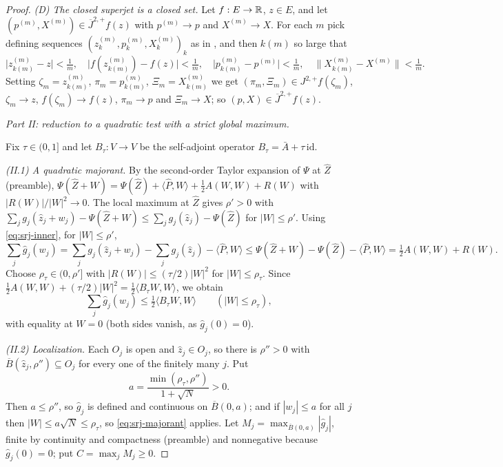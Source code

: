 \begin{proof}
\emph{(D) The closed superjet is a closed set.}
Let $f:E\to\mathbb{R}$, $z\in E$, and let $(p^{(m)},X^{(m)})\in\overline J^{2,+}f(z)$
with $p^{(m)}\to p$ and $X^{(m)}\to X$. For each $m$ pick defining sequences
$(z^{(m)}_k,p^{(m)}_k,X^{(m)}_k)_k$ as in , and then
$k(m)$ so large that
\[
  \bigl|z^{(m)}_{k(m)}-z\bigr|<\tfrac1m,\quad
  \bigl|f(z^{(m)}_{k(m)})-f(z)\bigr|<\tfrac1m,\quad
  \bigl|p^{(m)}_{k(m)}-p^{(m)}\bigr|<\tfrac1m,\quad
  \bigl\|X^{(m)}_{k(m)}-X^{(m)}\bigr\|<\tfrac1m .
\]
Setting $\zeta_m=z^{(m)}_{k(m)}$, $\pi_m=p^{(m)}_{k(m)}$,
$\Xi_m=X^{(m)}_{k(m)}$ we get $(\pi_m,\Xi_m)\in J^{2,+}f(\zeta_m)$,
$\zeta_m\to z$, $f(\zeta_m)\to f(z)$, $\pi_m\to p$ and $\Xi_m\to X$; so
$(p,X)\in\overline J^{2,+}f(z)$.

\medskip\noindent\emph{Part II: reduction to a quadratic test with a strict
global maximum.}

Fix $\tau\in(0,1]$ and let $B_\tau:V\to V$ be the self-adjoint operator
$B_\tau=\bar A+\tau\,\mathrm{id}$.

\emph{(II.1) A quadratic majorant.}
By the second-order Taylor expansion of $\Psi$ at $\widehat Z$ (preamble),
$\Psi(\widehat Z+W)=\Psi(\widehat Z)+\langle\widehat P,W\rangle
+\tfrac12A(W,W)+R(W)$ with $|R(W)|/|W|^2\to0$. The local maximum at
$\widehat Z$ gives $\rho'>0$ with
$\sum_jg_j(\widehat z_j+w_j)-\Psi(\widehat Z+W)\le\sum_jg_j(\widehat z_j)
-\Psi(\widehat Z)$ for $|W|\le\rho'$. Using \eqref{eq:srj-inner}, for
$|W|\le\rho'$,
\[
  \sum_j\widehat g_j(w_j)
   =\sum_jg_j(\widehat z_j+w_j)-\sum_jg_j(\widehat z_j)-\langle\widehat P,W\rangle
   \le\Psi(\widehat Z+W)-\Psi(\widehat Z)-\langle\widehat P,W\rangle
   =\tfrac12A(W,W)+R(W).
\]
Choose $\rho_\tau\in(0,\rho']$ with $|R(W)|\le(\tau/2)|W|^2$ for
$|W|\le\rho_\tau$. Since $\tfrac12A(W,W)+(\tau/2)|W|^2
=\tfrac12\langle B_\tau W,W\rangle$, we obtain
\begin{equation}\label{eq:srj-majorant}
  \sum_j\widehat g_j(w_j)\le\tfrac12\langle B_\tau W,W\rangle
  \qquad(|W|\le\rho_\tau),
\end{equation}
with equality at $W=0$ (both sides vanish, as $\widehat g_j(0)=0$).

\emph{(II.2) Localization.}
Each $O_j$ is open and $\widehat z_j\in O_j$, so there is $\rho''>0$ with
$\overline B(\widehat z_j,\rho'')\subseteq O_j$ for every one of the finitely
many $j$. Put
\[
  a=\frac{\min(\rho_\tau,\rho'')}{1+\sqrt N}>0 .
\]
Then $a\le\rho''$, so $\widehat g_j$ is defined and continuous on
$\overline B(0,a)$; and if $|w_j|\le a$ for all $j$ then
$|W|\le a\sqrt N\le\rho_\tau$, so \eqref{eq:srj-majorant} applies. Let
$M_j=\max_{\overline B(0,a)}|\widehat g_j|$, finite by continuity and
compactness (preamble) and nonnegative because $\widehat g_j(0)=0$; put
$C=\max_jM_j\ge0$.


\end{proof}

